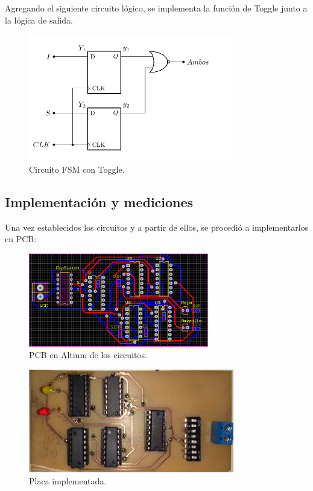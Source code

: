 Agregando el siguiente circuito lógico, se implementa la función de Toggle junto a la lógica de salida.
\begin{figure}[H]
	\centering
	\includegraphics[width=0.8\textwidth, page=2]{ImagenesEjercicio1/Circuitos.pdf}
	\caption{Circuito FSM con Toggle.}
	\label{fig:fsm2}
\end{figure}

\subsection{Implementación y mediciones}

Una vez establecidos los circuitos y a partir de ellos, se procedió a implementarlos en PCB:
\begin{figure}[H]
	\centering
	\includegraphics[width=0.7\textwidth]{ImagenesEjercicio1/PCB.PNG}
	\caption{PCB en Altium de los circuitos.}
\end{figure}
\begin{figure}[H]
	\centering
	\includegraphics[width=0.8\textwidth]{ImagenesEjercicio1/pcbReal.jpeg}
	\caption{Placa implementada.}
\end{figure}

